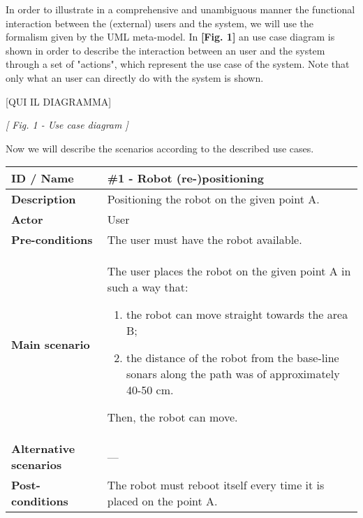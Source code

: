 \documentclass[a4paper]{article}
\begin{document}
In order to illustrate in a comprehensive and unambiguous manner the functional interaction between the (external) users and the system, we will use the formalism given by the UML meta-model. In \textbf{[Fig. 1]} an use case diagram is shown in order to describe the interaction between an user and the system through a set of "actions", which represent the use case of the system.\newline\newline
Note that only what an user can directly do with the system is shown.
\newline

\begin{center}
	[QUI IL DIAGRAMMA]
\end{center}

\begin{center}
	\textit{[ Fig. 1 - Use case diagram ]}
\end{center}

\hfill \break

Now we will describe the scenarios according to the described use cases. \hfill \break

\def\arraystretch{1.8}
\begin{tabular}{ | m{4cm} | m{11cm}| }
	
	\hline
	
	\textbf{ID / Name}&\textbf{\#1 - Robot (re-)positioning}\\ 
	
	\hline
	
	\textbf{Description}&Positioning the robot on the given point A.\\

	\hline
	
	\textbf{Actor}&User\\
	
	\hline	

	\textbf{Pre-conditions}&The user must have the robot available.\\

	\hline

	\textbf{Main scenario}&The user places the robot on the given point A in such a way that:
	\begin{enumerate}
		\item the robot can move straight towards the area B;
		\item the distance of the robot from the base-line sonars along the path was of approximately 40-50 cm.
	\end{enumerate}
	Then, the robot can move.\\
	
	\hline	
	
	\textbf{Alternative scenarios}&---\\
	
	\hline
	
	\textbf{Post-conditions}&The robot must reboot itself every time it is placed on the point A.\\

	\hline

\end{tabular}
\end{document}
